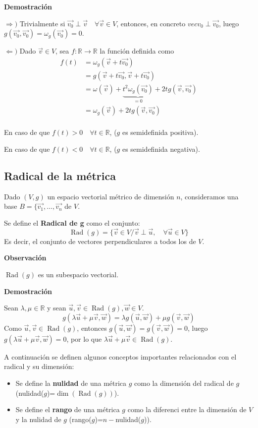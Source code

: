 \documentclass[x11names,table]{report}
\DeclareMathOperator{\rad}{Rad}
\begin{document}
\textbf{Demostración}

$\Rightarrow)$ Trivialmente si $\vec{v_0}\perp\vec{v}\quad\forall\vec{v}\in V$, entonces, en concreto $vec{v_0}\perp\vec{v_0}$, luego $g(\vec{v_0},\vec{v_0})=\omega_g(\vec{v_0})=0$.

$\Leftarrow)$ Dado $\vec{v}\in V$, sea $f:\mathbb{R}\longrightarrow\mathbb{R}$ la función definida como 
\begin{align*}
f(t)&=\omega_g(\vec{v}+t\vec{v_0})\\
&=g(\vec{v}+t\vec{v_0},\vec{v}+t\vec{v_0})\\
&=\omega(\vec{v})+\underbrace{t^2\omega_g(\vec{v_0})}_{=0}+2tg(\vec{v},\vec{v_0})\\
&=\omega_g(\vec{v})+2tg(\vec{v},\vec{v_0})\\
\end{align*}

En caso de que $f(t)>0\quad\forall t\in\mathbb{R}$, ($g$ es semidefinida positiva).

En caso de que $f(t)<0\quad\forall t\in\mathbb{R}$, ($g$ es semidefinida negativa).

\subsection{Radical de la métrica}

Dado $(V,g)$ un espacio vectorial métrico de dimensión $n$, consideramos una base $B=\{\vec{v_1},\dots,\vec{v_n}$ de $V$.

Se define el \textbf{Radical de g} como el conjunto:
\[\rad(g)=\{\vec{v}\in V/\vec{v}\perp\vec{u},\quad\forall\vec{u}\in V\}\]
Es decir, el conjunto de vectores perpendiculares a todos los de $V$.

\textbf{Observación}

$\rad(g)$ es un subespacio vectorial.

\textbf{Demostración}

Sean $\lambda,\mu\in\mathbb{R}$ y sean $\vec{u},\vec{v}\in\rad(g),\vec{w}\in V$.
\[g(\lambda\vec{u}+\mu \vec{v},\vec{w})=\lambda g(\vec{u},\vec{w})+\mu g(\vec{v},\vec{w})\]
Como $\vec{u},\vec{v}\in\rad(g)$, entonces $g(\vec{u},\vec{w})=g(\vec{v},\vec{w})=0$, luego $g(\lambda\vec{u}+\mu \vec{v},\vec{w})=0$, por lo que $\lambda\vec{u}+\mu \vec{v}\in\rad(g)$.

A continuación se definen algunos conceptos importantes relacionados con el radical y su dimensión:
\begin{itemize}
\item Se define la \textbf{nulidad} de una métrica $g$ como la dimensión del radical de $g$ (nulidad($g$)=$\dim(\rad(g))$).
\item Se define el \textbf{rango} de una métrica $g$ como la diferenci entre la dimensión de $V$ y la nulidad de $g$ (rango($g$)=$n-$nulidad($g$)).
\end{itemize}
\end{document}

